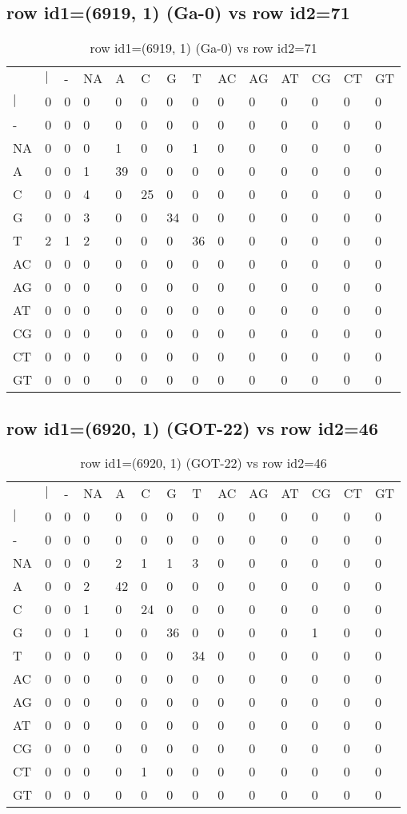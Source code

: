 \subsection{row id1=(6919, 1) (Ga-0) vs row id2=71}
\begin{center}
\begin{longtable}{|l|l|l|l|l|l|l|l|l|l|l|l|l|l|}
\caption{row id1=(6919, 1) (Ga-0) vs row id2=71} \label{table_dm104}\\
\hline
\\
\hline
&$|$&-&NA&A&C&G&T&AC&AG&AT&CG&CT&GT\\
$|$&0&0&0&0&0&0&0&0&0&0&0&0&0\\
-&0&0&0&0&0&0&0&0&0&0&0&0&0\\
NA&0&0&0&1&0&0&1&0&0&0&0&0&0\\
A&0&0&1&39&0&0&0&0&0&0&0&0&0\\
C&0&0&4&0&25&0&0&0&0&0&0&0&0\\
G&0&0&3&0&0&34&0&0&0&0&0&0&0\\
T&2&1&2&0&0&0&36&0&0&0&0&0&0\\
AC&0&0&0&0&0&0&0&0&0&0&0&0&0\\
AG&0&0&0&0&0&0&0&0&0&0&0&0&0\\
AT&0&0&0&0&0&0&0&0&0&0&0&0&0\\
CG&0&0&0&0&0&0&0&0&0&0&0&0&0\\
CT&0&0&0&0&0&0&0&0&0&0&0&0&0\\
GT&0&0&0&0&0&0&0&0&0&0&0&0&0\\
\hline
\end{longtable}
\end{center}

\subsection{row id1=(6920, 1) (GOT-22) vs row id2=46}
\begin{center}
\begin{longtable}{|l|l|l|l|l|l|l|l|l|l|l|l|l|l|}
\caption{row id1=(6920, 1) (GOT-22) vs row id2=46} \label{table_dm106}\\
\hline
\\
\hline
&$|$&-&NA&A&C&G&T&AC&AG&AT&CG&CT&GT\\
$|$&0&0&0&0&0&0&0&0&0&0&0&0&0\\
-&0&0&0&0&0&0&0&0&0&0&0&0&0\\
NA&0&0&0&2&1&1&3&0&0&0&0&0&0\\
A&0&0&2&42&0&0&0&0&0&0&0&0&0\\
C&0&0&1&0&24&0&0&0&0&0&0&0&0\\
G&0&0&1&0&0&36&0&0&0&0&1&0&0\\
T&0&0&0&0&0&0&34&0&0&0&0&0&0\\
AC&0&0&0&0&0&0&0&0&0&0&0&0&0\\
AG&0&0&0&0&0&0&0&0&0&0&0&0&0\\
AT&0&0&0&0&0&0&0&0&0&0&0&0&0\\
CG&0&0&0&0&0&0&0&0&0&0&0&0&0\\
CT&0&0&0&0&1&0&0&0&0&0&0&0&0\\
GT&0&0&0&0&0&0&0&0&0&0&0&0&0\\
\hline
\end{longtable}
\end{center}

